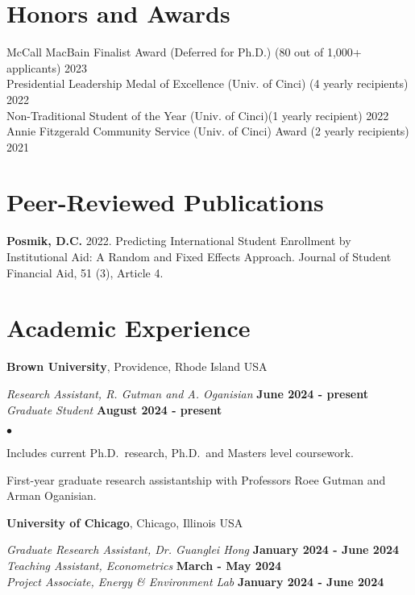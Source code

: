 \documentclass[margin,line]{res}
\newenvironment{list2}{
  \begin{list}{$\bullet$}{%
      \setlength{\itemsep}{0in}
      \setlength{\parsep}{0in} \setlength{\parskip}{0in}
      \setlength{\topsep}{0in} \setlength{\partopsep}{0in} 
      \setlength{\leftmargin}{0.2in}}}{\end{list}}
\begin{document}
\begin{resume}
\section{\sc Honors and Awards} 
McCall MacBain Finalist Award (Deferred for Ph.D.) (80 out of 1,000+ applicants) \hfill 2023 \\  
Presidential Leadership Medal of Excellence (Univ. of Cinci) (4 yearly recipients) \hfill 2022 \\ 
Non-Traditional Student of the Year (Univ. of Cinci)(1 yearly recipient) \hfill 2022 \\
Annie Fitzgerald Community Service (Univ. of Cinci) Award (2 yearly recipients) \hfill 2021


\section{\sc Peer-Reviewed Publications}
{\bf Posmik, D.C.} 2022. Predicting International Student Enrollment by Institutional Aid: A Random and Fixed Effects Approach. Journal of Student Financial Aid, 51 (3), Article 4.  


\section{\sc Academic Experience}
{\bf Brown University}, Providence, Rhode Island USA

\vspace{-.3cm}
{\em Research Assistant, R. Gutman and A. Oganisian} \hfill {\bf June 2024 - present}\\
{\em Graduate Student} \hfill {\bf August 2024 - present}\\

\begin{list2}
\item Includes current Ph.D.~research, Ph.D.~and Masters level coursework. 
\item First-year graduate research assistantship with Professors Roee Gutman and Arman Oganisian.
\end{list2}

{\bf University of Chicago}, Chicago, Illinois USA

\vspace{-.3cm}
{\em Graduate Research Assistant, Dr. Guanglei Hong} \hfill {\bf January 2024 - June 2024}\\
{\em Teaching Assistant, Econometrics} \hfill {\bf March - May 2024}\\
{\em Project Associate, Energy \& Environment Lab} \hfill {\bf January 2024 - June 2024}\\


\end{resume}
\end{document}
